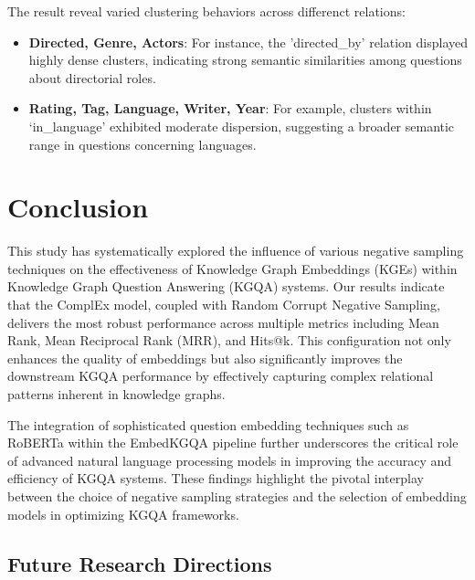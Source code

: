 \documentclass{article}
\begin{document}
The result reveal varied clustering behaviors across differenct relations:
\begin{itemize}

  \item \textbf{Directed, Genre, Actors}: For instance, the 'directed\_by' relation displayed highly dense clusters, indicating strong semantic similarities among questions about directorial roles.
    
    \item \textbf{Rating, Tag, Language, Writer, Year}: For example, clusters within ‘in\_language’ exhibited moderate dispersion, suggesting a broader semantic range in questions concerning languages.
    
\end{itemize}

\section{Conclusion}

This study has systematically explored the influence of various negative sampling techniques on the effectiveness of Knowledge Graph Embeddings (KGEs) within Knowledge Graph Question Answering (KGQA) systems. Our results indicate that the ComplEx model, coupled with Random Corrupt Negative Sampling, delivers the most robust performance across multiple metrics including Mean Rank, Mean Reciprocal Rank (MRR), and Hits@k. This configuration not only enhances the quality of embeddings but also significantly improves the downstream KGQA performance by effectively capturing complex relational patterns inherent in knowledge graphs.

The integration of sophisticated question embedding techniques such as RoBERTa within the EmbedKGQA pipeline further underscores the critical role of advanced natural language processing models in improving the accuracy and efficiency of KGQA systems. These findings highlight the pivotal interplay between the choice of negative sampling strategies and the selection of embedding models in optimizing KGQA frameworks.

\subsection{Future Research Directions}
\end{document}
